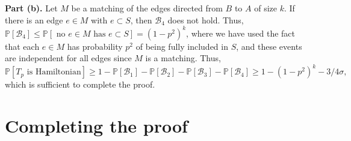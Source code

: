 \documentclass[a4paper,11pt]{article}
\makeatletter
\renewenvironment{proof}[1][\proofname] {\par\pushQED{\qed}\normalfont\topsep6\p@\@plus6\p@\relax\trivlist\item[\hskip\labelsep\textit{#1}\@addpunct{.}]\ignorespaces}{\popQED\endtrivlist\@endpefalse}
\theoremstyle{definition}
\def\Pb{\mathbb{P}}
\def\cB{\mathcal{B}}
\makeatother
\begin{document}
\begin{proof}[Proof of Lemma~\ref{lemma:using connectors}.]
\noindent
\textbf{Part {(b)}.} Let $M$ be a matching of the edges directed from $B$ to $A$ of size $k$. If there is an edge $e\in M$ with $e\subset S$, then $\cB_4$ does not hold. Thus, $\Pb[\cB_4]\leq \Pb[\text{ no $e\in M$ has $e\subset S$}]= (1-p^2)^k$, where we have used the fact that each $e\in M$ has probability $p^2$ of being fully included in $S$, and these events are independent for all edges since $M$ is a matching. Thus, 
\[\Pb[T_p\text{ is Hamiltonian}]\geq 1-\Pb[\cB_1]- \Pb[\cB_2]- \Pb[\cB_3]-\Pb[\cB_4]\geq 1-(1-p^2)^k-3/4\sigma,\]
which is sufficient to complete the proof.
\end{proof}


\section{Completing the proof}\label{sec:completing}
\end{document}
